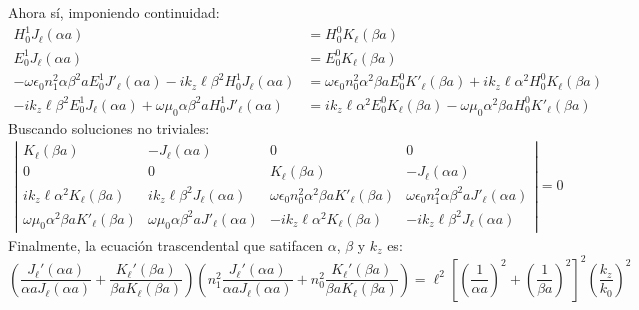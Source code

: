 Ahora sí, imponiendo continuidad:
\begin{align}
	H_0^{1} J_\ell(\alpha a) &= H_0^{0} K_\ell (\beta a)
	\label{eqn:cont1}
	\\
	E_0^{1} J_\ell(\alpha a) &= E_0^{0} K_\ell (\beta a)
	\label{eqn:cont2}
	 \\
	 -\omega \epsilon_0 n_1^2  \alpha\beta^2 a E_0^1 J'_\ell (\alpha a)-ik_z\ell \beta^2 H_0^1  J_\ell (\alpha a)
	 &= \omega \epsilon_0 n_0^2 \alpha^2 \beta a E_0^0 K'_\ell (\beta a)+ik_z\ell \alpha^2H_0^0  K_\ell (\beta a)
	 \label{eqn:cont3}
	 \\
	 -ik_z \ell \beta^2 E_0^1   J_\ell (\alpha a) + \omega \mu_0  \alpha \beta^2 a H_0^1  J'_\ell (\alpha a) &=
	 ik_z \ell \alpha^2 E_0^0   K_\ell (\beta a) -\omega \mu_0  \alpha^2 \beta a H_0^0  K'_\ell (\beta a)
	 \label{eqn:cont4}
\end{align}
Buscando soluciones no triviales:
\begin{align*}
	\left|\begin{matrix}
		K_\ell(\beta a) & -J_\ell(\alpha a) & 0 & 0
		\\
		0 & 0 & K_\ell(\beta a) & -J_\ell(\alpha a)
		\\
		ik_z\ell \alpha^2 K_\ell (\beta a) & ik_z\ell\beta^2 J_\ell (\alpha a) & \omega \epsilon_0 n_0^2  \alpha^2 \beta a K'_\ell (\beta a) & \omega \epsilon_0 n_1^2  \alpha \beta^2 a J'_\ell (\alpha a)
		\\
		\omega \mu_0  \alpha^2 \beta a   K'_\ell (\beta a) &  \omega \mu_0  \alpha \beta^2 a J'_\ell (\alpha a) & -ik_z \ell \alpha^2 K_\ell (\beta a) &  -ik_z \ell \beta^2  J_\ell (\alpha a)
	\end{matrix}\right|
	=
0
\end{align*}
Finalmente, la ecuación trascendental que satifacen $\alpha$, $\beta$ y $k_z$ es:
\begin{equation}
	\left( \frac{J_\ell'(\alpha a)}{\alpha a J_\ell(\alpha a)} + \frac{K_\ell'(\beta a)}{\beta a K_\ell(\beta a)} \right)\left( n_1^2\frac{J_\ell'(\alpha a)}{\alpha a J_\ell(\alpha a)} + n_0^2\frac{K_\ell'(\beta a)}{\beta a K_\ell(\beta a)} \right) = \ell^2 \left[ \left(\frac{1}{\alpha a}\right)^2 + \left(\frac{1}{\beta a}\right)^2 \right]^2 \left( \frac{k_z}{k_0} \right)^2 \label{eqn:fiber_trascendental}
\end{equation}

